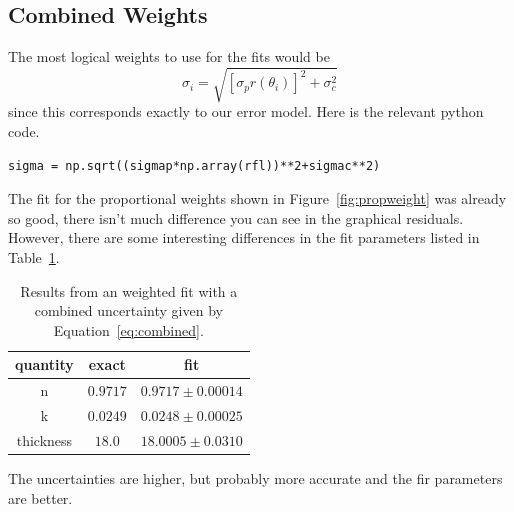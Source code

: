 \documentclass[english]{scrartcl}
\begin{document}
\subsection{Combined Weights}
The most logical weights to use for the fits would be
\begin{equation}
\sigma_i = \sqrt{[\sigma_p r(\theta_i)]^2+\sigma_c^2}\label{eq:combined}
\end{equation}
since this corresponds exactly to our error model. Here is
the relevant python code.
\begin{lstlisting}
sigma = np.sqrt((sigmap*np.array(rfl))**2+sigmac**2)
\end{lstlisting}
The fit
for the proportional weights shown in Figure~\ref{fig:propweight}
was already so good, there isn't much difference you can see in the
graphical residuals. However, there are some interesting differences
in the fit parameters listed in Table~\ref{tab:combweight}.
\begin{table}[htb]
\begin{center}
\begin{tabular}{| c | c | c |}
\hline
quantity & exact & fit\\ \hline\hline
n & $0.9717$ & $0.9717\pm 0.00014$\\
k & $0.0249$ & $0.0248\pm 0.00025$\\
thickness & $18.0$ & $18.0005\pm 0.0310$\\ \hline
\end{tabular}
\end{center}
\caption{\label{tab:combweight}Results from an weighted fit with a
combined uncertainty given by Equation~\ref{eq:combined}.}
\end{table}
The uncertainties are higher, but probably more accurate and the
fir parameters are better.

\appendix
\end{document}
